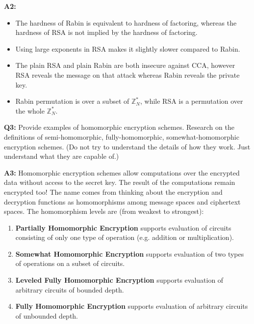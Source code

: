 \documentclass[12pt,reqno]{amsart}
\begin{document}
\textbf{A2:} 
\begin{itemize}
	\item The hardness of Rabin is equivalent to hardness of factoring, whereas the hardness of RSA is not implied by the hardness of factoring.
	\item Using large exponents in RSA makes it slightly slower compared to Rabin.
	\item The plain RSA and plain Rabin are both insecure against CCA, however RSA reveals the message on that attack whereas Rabin reveals the private key.
	\item Rabin permutation is over a subset of $\mathbb{Z}_N^*$, while RSA is a permutation over the whole $\mathbb{Z}_N^*$.
\end{itemize}

\vspace{20px}
\textbf{Q3:} Provide examples of homomorphic encryption schemes. Research on the definitions of semi-homomorphic, fully-homomorphic, somewhat-homomorphic encryption schemes. (Do not try to understand the details of how they work. Just understand what they are capable of.)


\textbf{A3:} 
Homomorphic encryption schemes allow computations over the encrypted data without access to the secret key. The result of the computations remain encrypted too! The name comes from thinking about the encryption and decryption functions as homomorphisms among message spaces and ciphertext spaces. The homomorphism levels are (from weakest to strongest):

\begin{enumerate}
	\item \textbf{Partially Homomorphic Encryption} supports evaluation of circuits consisting of only one type of operation (e.g. addition or multiplication).
	\item \textbf{Somewhat Homomorphic Encryption} supports evaluation of two types of operations on a subset of circuits.
	\item \textbf{Leveled Fully Homomorphic Encryption} supports evaluation of arbitrary circuits of bounded depth.
	\item \textbf{Fully Homomorphic Encryption} supports evaluation of arbitrary circuits of unbounded depth.
\end{enumerate}
\end{document}
